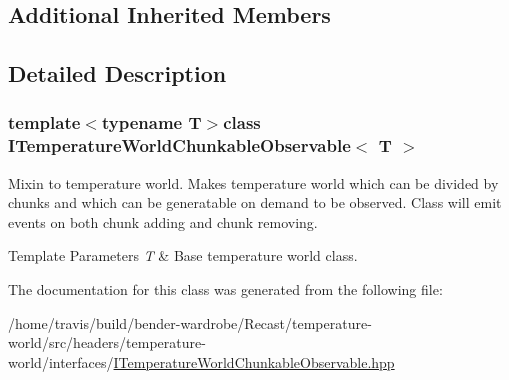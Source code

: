 \subsection*{Additional Inherited Members}


\subsection{Detailed Description}
\subsubsection*{template$<$typename T$>$class I\-Temperature\-World\-Chunkable\-Observable$<$ T $>$}

Mixin to temperature world. Makes temperature world which can be divided by chunks and which can be generatable on demand to be observed. Class will emit events on both chunk adding and chunk removing.


\begin{DoxyTemplParams}{Template Parameters}
{\em T} & Base temperature world class. \\
\hline
\end{DoxyTemplParams}


The documentation for this class was generated from the following file\-:\begin{DoxyCompactItemize}
\item 
/home/travis/build/bender-\/wardrobe/\-Recast/temperature-\/world/src/headers/temperature-\/world/interfaces/\hyperlink{_i_temperature_world_chunkable_observable_8hpp}{I\-Temperature\-World\-Chunkable\-Observable.\-hpp}\end{DoxyCompactItemize}
